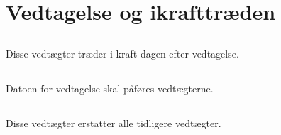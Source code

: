 \documentclass[danish,a4paper,twocolumn,oneside,article]{memoir}
\begin{document}
\chapter{Vedtagelse og ikrafttræden}

\section{} Disse vedtægter træder i kraft dagen efter vedtagelse.

\section{}\label{s:dateonbylaws} Datoen for vedtagelse skal påføres vedtægterne.

\section{} Disse vedtægter erstatter alle tidligere vedtægter.
\end{document}
